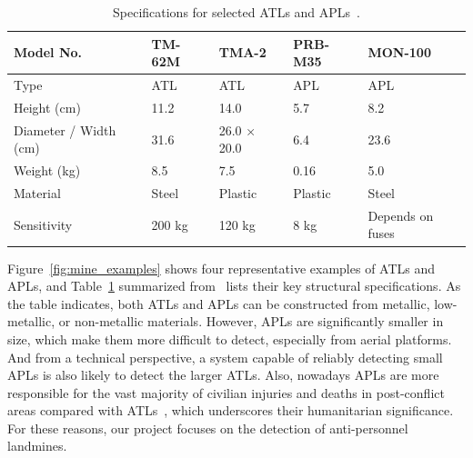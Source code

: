\begin{table}[h]
    \centering
    \small
    \renewcommand{\arraystretch}{1.3}
    \caption{Specifications for selected ATLs and APLs~\cite{paik2002image}.}
    \label{tab:mine_specs}
    \begin{tabular}{l p{2.8cm} p{2.8cm} p{2.8cm} p{2.8cm}}
        \toprule
        \textbf{Model No.} & \textbf{TM-62M} & \textbf{TMA-2} & \textbf{PRB-M35} & \textbf{MON-100} \\
        \midrule
        Type & ATL & ATL & APL & APL \\
        Height (cm) & 11.2 & 14.0 & 5.7 & 8.2 \\
        Diameter / Width (cm) & 31.6 & 26.0 × 20.0 & 6.4 & 23.6 \\
        Weight (kg) & 8.5 & 7.5 & 0.16 & 5.0 \\
        Material & Steel & Plastic & Plastic & Steel \\
        Sensitivity & 200 kg & 120 kg & 8 kg & Depends on fuses \\
        \bottomrule
    \end{tabular}
\end{table}

Figure~\ref{fig:mine_examples} shows four representative examples of ATLs and APLs, and Table~\ref{tab:mine_specs} summarized from~\cite{paik2002image} lists their key structural specifications. As the table indicates, both ATLs and APLs can be constructed from metallic, low-metallic, or non-metallic materials. However, APLs are significantly smaller in size, which make them more difficult to detect, especially from aerial platforms. And from a technical perspective, a system capable of reliably detecting small APLs is also likely to detect the larger ATLs. Also, nowadays APLs are more responsible for the vast majority of civilian injuries and deaths in post-conflict areas compared with ATLs~\cite{unmas2021handbook}, which underscores their humanitarian significance. For these reasons, our project focuses on the detection of anti-personnel landmines.
